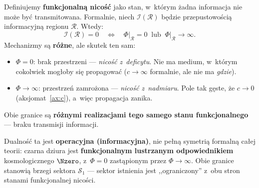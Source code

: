 \begin{definition}\label{def:N0-dual}
Definiujemy \textbf{funkcjonaln\k{a} nico\'s\'c} jako stan,
w~kt\'orym \.zadna informacja nie mo\.ze by\'c transmitowana.
Formalnie, niech $\mathcal{I}(\mathcal{R})$ b\k{e}dzie
przepustowo\'sci\k{a} informacyjn\k{a} regionu $\mathcal{R}$.
Wtedy:
\begin{equation}\label{eq:functional-N0}
    \mathcal{I}(\mathcal{R}) = 0
    \quad\Longleftrightarrow\quad
    \Phi\big|_{\mathcal{R}} = 0
    \;\;\text{lub}\;\;
    \Phi\big|_{\mathcal{R}} \to \infty.
\end{equation}
Mechanizmy s\k{a} \textbf{r\'o\.zne}, ale skutek ten sam:
\begin{itemize}[nosep]
  \item $\Phi = 0$: brak przestrzeni --- \emph{nico\'s\'c z~deficytu}.
    Nie ma medium, w~kt\'orym cokolwiek mog\l{}oby si\k{e}
    propagowa\'c ($c \to \infty$ formalnie, ale nie ma \emph{gdzie}).
  \item $\Phi \to \infty$: przestrze\'n zamro\.zona ---
    \emph{nico\'s\'c z~nadmiaru}.
    Pole tak g\k{e}ste, \.ze $c \to 0$ (aksjomat~\ref{ax:c}),
    a~wi\k{e}c propagacja zanika.
\end{itemize}
Obie granice s\k{a} \textbf{r\'o\.znymi realizacjami tego samego stanu
funkcjonalnego} --- braku transmisji informacji.
\end{definition}

Dualno\'s\'c ta jest \textbf{operacyjna (informacyjna)},
nie pe\l{}n\k{a} symetri\k{a} formaln\k{a} ca\l{}ej teorii:
czarna dziura jest \textbf{funkcjonalnym lustrzanym
odpowiednikiem} kosmologicznego $\Nzero$, z~$\Phi = 0$
zast\k{a}pionym przez $\Phi \to \infty$.
Obie granice stanowi\k{a} brzegi sektora $\mathcal{S}_1$
--- sektor istnienia jest ,,ograniczony'' z~obu stron
stanami funkcjonalnej nico\'sci.

